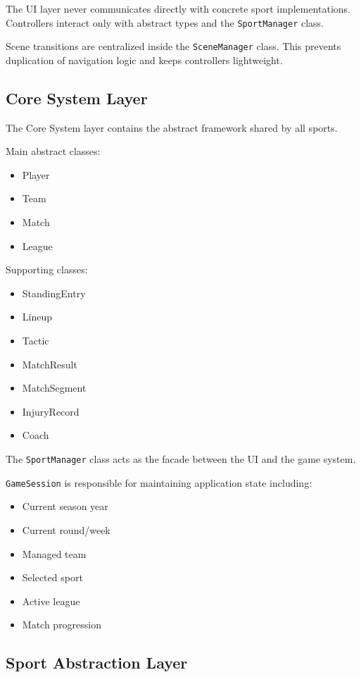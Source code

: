 \documentclass[11pt,a4paper]{article}
\begin{document}
The UI layer never communicates directly with concrete sport implementations. Controllers interact only with abstract types and the \texttt{SportManager} class.

Scene transitions are centralized inside the \texttt{SceneManager} class. This prevents duplication of navigation logic and keeps controllers lightweight.

\subsection{Core System Layer}

The Core System layer contains the abstract framework shared by all sports.

Main abstract classes:
\begin{itemize}
\item Player
\item Team
\item Match
\item League
\end{itemize}

Supporting classes:
\begin{itemize}
\item StandingEntry
\item Lineup
\item Tactic
\item MatchResult
\item MatchSegment
\item InjuryRecord
\item Coach
\end{itemize}

The \texttt{SportManager} class acts as the facade between the UI and the game system.

\texttt{GameSession} is responsible for maintaining application state including:
\begin{itemize}
\item Current season year
\item Current round/week
\item Managed team
\item Selected sport
\item Active league
\item Match progression
\end{itemize}

\subsection{Sport Abstraction Layer}
\end{document}

